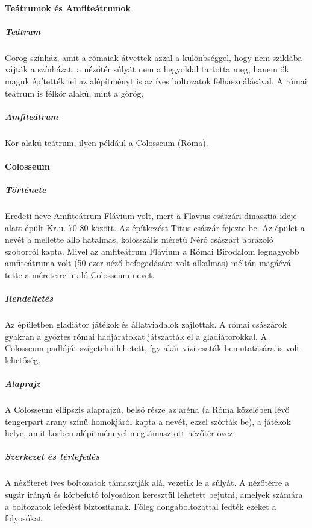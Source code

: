 \paragraph{Teátrumok és Amfiteátrumok}

	\subparagraph{Teátrum}
	Görög színház, amit a rómaiak átvettek azzal a különbséggel, hogy nem sziklába vájták a színházat, a nézőtér súlyát nem a hegyoldal tartotta meg, hanem ők maguk építették fel az alépítményt is az íves boltozatok felhasználásával. A római teátrum is félkör alakú, mint a görög.
	
	\subparagraph{Amfiteátrum}
	Kör alakú teátrum, ilyen például a Colosseum (Róma).	

\paragraph{Colosseum}

	\subparagraph{Története}
	Eredeti neve Amfiteátrum Flávium volt, mert a Flavius császári dinasztia ideje alatt épült Kr.u. 70-80 között. Az építkezést Titus császár fejezte be. Az épület a nevét a mellette álló hatalmas, kolosszális méretű Néró császárt ábrázoló szoborról kapta. Mivel az amfiteátrum Flávium a Római Birodalom legnagyobb amfiteátruma volt (50 ezer néző befogadására volt alkalmas) méltán magáévá tette a méreteire utaló Colosseum nevet.
	
	
	\subparagraph{Rendeltetés}
	Az épületben gladiátor játékok és állatviadalok zajlottak. A római császárok gyakran a győztes római hadjáratokat játszatták el a gladiátorokkal. A Colosseum padlóját szigetelni lehetett, így akár vízi csaták bemutatására is volt lehetőség.
	
	\subparagraph{Alaprajz}
	A Colosseum ellipszis alaprajzú, belső része az aréna (a Róma közelében lévő tengerpart arany színű homokjáról kapta a nevét, ezzel szórták be), a játékok helye, amit körben alépítménnyel megtámasztott nézőtér övez.
	
	\subparagraph{Szerkezet és térlefedés}
	A nézőteret íves boltozatok támasztják alá, vezetik le a súlyát. A nézőtérre a sugár irányú és körbefutó folyosókon keresztül lehetett bejutni, amelyek számára a boltozatok lefedést biztosítanak. Főleg dongaboltozattal fedték ezeket a folyosókat.
	
